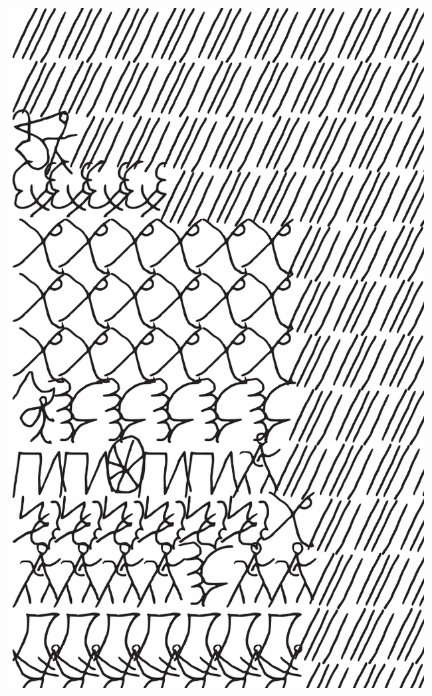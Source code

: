 \makeatletter\@openrightfalse
\movetooddpage
\begin{absolutelynopagebreak}
\begin{vplace}
\begin{figure}[H]
\begin{adjustwidth}{-0.99cm}{}
  \centering
  \vspace*{-1.77cm}
  \hspace*{-0.45cm}
  \includegraphics[width=110mm]{./imgs/img9.pdf}  
  \hfill
\end{adjustwidth}

\thispagestyle{empty}

\end{figure}
\end{vplace}

\end{absolutelynopagebreak}

